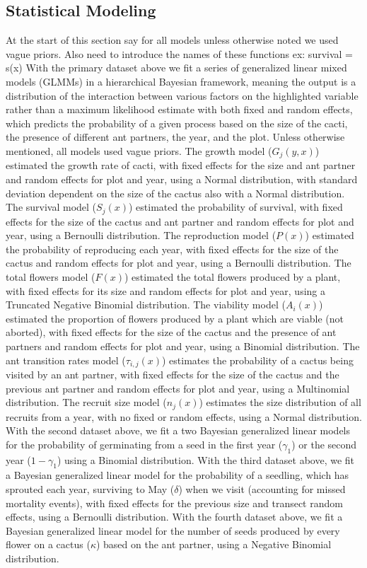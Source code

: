 \documentclass[12pt,a4paper]{article}
\begin{document}
{{\subsection*{Statistical Modeling}
At the start of this section say for all models unless otherwise noted we used vague priors. 
Also need to introduce the names of these functions ex: survival = s(x)
With the primary dataset above we fit a series of generalized linear mixed models (GLMMs) in a hierarchical Bayesian framework, meaning the output is a distribution of the interaction between various factors on the highlighted variable rather than a maximum likelihood estimate with both fixed and random effects, which predicts the probability of a given process based on the size of the cacti, the presence of different ant partners, the year, and the plot.
Unless otherwise mentioned, all models used vague priors. 
The growth model ($G_j(y,x)$) estimated the growth rate of cacti, with fixed effects for the size and ant partner and random effects for plot and year, using a Normal distribution, with standard deviation dependent on the size of the cactus also with a Normal distribution. 
The survival model ($S_j(x)$) estimated the probability of survival, with fixed effects for the size of the cactus and ant partner and random effects for plot and year, using a Bernoulli distribution. 
The reproduction model ($P(x)$) estimated the probability of reproducing each year, with fixed effects for the size of the cactus and random effects for plot and year, using a Bernoulli distribution. 
The total flowers model ($F(x)$) estimated the total flowers produced by a plant, with fixed effects for its size and random effects for plot and year, using a Truncated Negative Binomial distribution. 
The viability model ($A_i(x)$) estimated the proportion of flowers produced by a plant which are viable (not aborted), with fixed effects for the size of the cactus and the presence of ant partners and random effects for plot and year, using a Binomial distribution.
The ant transition rates model ($\tau_{i,j}(x)$) estimates the probability of a cactus being visited by an ant partner, with fixed effects for the size of the cactus and the previous ant partner and random effects for plot and year, using a Multinomial distribution.  
The recruit size model ($n_j(x)$) estimates the size distribution of all recruits from a year, with no fixed or random effects, using a Normal distribution. 
With the second dataset above, we fit a two Bayesian generalized linear models for the 
probability of germinating from a seed in the first year ($\gamma_1$) or the second year ($1 - \gamma_1$) using a Binomial distribution.
With the third dataset above, we fit a Bayesian generalized linear model for the probability of a seedling, which has sprouted each year, surviving to May ($\delta$) when we visit (accounting for missed mortality events), with fixed effects for the previous size and transect random effects, using a Bernoulli distribution. 
With the fourth dataset above, we fit a Bayesian generalized linear model for the number of seeds produced by every flower on a cactus ($\kappa$) based on the ant partner, using a Negative Binomial distribution. 

}}
\end{document}
